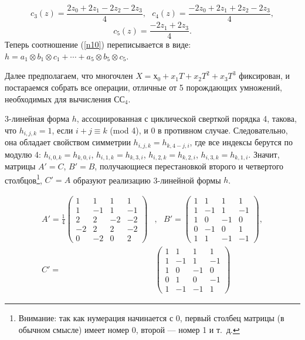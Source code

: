 \documentclass{mai_book}
\begin{document}
$$c_3(z)= \frac{2z_0 + 2z_1-2z_2-2z_3}{4},\ \ \ c_4(z)= \frac{-2z_0+2z_1+2z_2-2z_3}{4},$$
$$c_5(z)= \frac{-2z_1 + 2z_3}{4}.$$ Теперь соотношение (\ref{n10}) переписывается в виде: $h=a_1 \otimes b_1 \otimes c_1 + \cdots + a_5 \otimes b_5 \otimes c_5$.\par
Далее предполагаем, что многочлен $X = х_0 + x_1T + x_2T^2 + x_3T^3$ фиксирован, и постараемся собрать все операции, отличные от 5 порождающих умножений, необходимых для вычисления С{\footnotesize С}$_4$.\par 
3-линейная форма $h$, ассоциированная с циклической сверткой порядка 4, такова, что $h_{i,j,k}=1$, если $i + j \equiv k$ (mod 4), и 0 в противном случае. Следовательно, она обладает свойством симметрии $h_{i,j,k}=h_{k,4-j,i}$, где все индексы берутся по модулю 4: $h_{i,0,k}=h_{k,0,i}$, $h_{i,1,k}=h_{k,3,i}$, $h_{i,2,k}=h_{k,2,i}$, $h_{i,3,k}=h_{k,1,i}$. Значит, матрицы $A' = C$, $B' = B$, получающиеся перестановкой второго и четвертого столбцов\footnote{Внимание: так как нумерация начинается с 0, первый столбец матрицы (в обычном смысле) имеет номер 0, второй --- номер 1 и т.~д.}, $C' = A$ образуют реализацию 3-линейной формы $h$.
\begin{center}
  \begin{equation} \label{n11}
    \begin{split}
  A'= \frac{1}{4} \begin{pmatrix} 1 & 1 & 1 & 1 \\ 1 & -1 & 1 & -1 \\ 2 & 2 & -2 & -2 \\ -2 & 2 & 2 & -2 \\ 0 & -2 & 0 & 2 \end{pmatrix}&,\ \ \ B'=\begin{pmatrix} 1 & 1 & 1 & 1 \\ 1 & -1 & 1 & -1 \\ 1 & 0 & -1 & 0 \\ 0 & -1 & 0 & 1 \\ 1& 1 & -1 & -1 \end{pmatrix},\\
  C'= &\begin{pmatrix} 1 & 1 & 1 & 1 \\ 1 & -1 & 1 & -1 \\ 1 & 0 & -1 & 0 \\ 0 & 1 & 0 & -1 \\ 1 & -1 & -1 & 1 \end{pmatrix}
  \end{split}
  \end{equation}
  \end{center}\par
\end{document}
